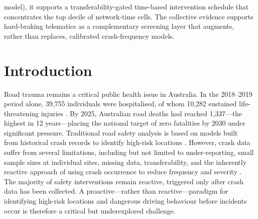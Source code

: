 \documentclass[letterpaper,8pt]{extarticle}  %
\begin{document}
\begin{doublespacing}
\begin{linenumbers}
model), it supports a transferability-gated time-based intervention schedule that concentrates the top decile of network-time cells. The collective evidence supports hard-braking telematics as a complementary screening layer that augments, rather than replaces, calibrated crash-frequency models.


\section{Introduction}\label{sec:intro}

Road trauma remains a critical public health issue in Australia. In the 2018--2019 period alone, 39{,}755 individuals were hospitalised, of whom 10{,}282 sustained life-threatening injuries \citep{BITRE2019}. By 2025, Australian road deaths had reached 1{,}337---the highest in 12 years---placing the national target of zero fatalities by 2030 under significant pressure. Traditional road safety analysis is based on models built from historical crash records to identify high-risk locations \cite{Miaou1993ModelingRelationships}. However, crash data suffer from several limitations, including but not limited to under-reporting, small sample sizes at individual sites, missing data, transferability, and the inherently reactive approach of using crash occurrence to reduce frequency and severity \cite{Lord2010TheAlternatives}. The majority of safety interventions remain reactive, triggered only after crash data has been collected. A proactive---rather than reactive---paradigm for identifying high-risk locations and dangerous driving behaviour before incidents occur is therefore a critical but underexplored challenge.\par


\end{linenumbers}
\end{doublespacing}
\end{document}
